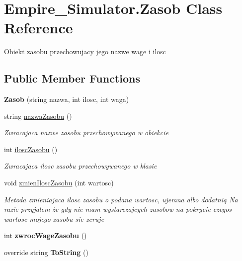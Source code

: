 \hypertarget{class_empire___simulator_1_1_zasob}{\section{Empire\+\_\+\+Simulator.\+Zasob Class Reference}
\label{class_empire___simulator_1_1_zasob}
}


Obiekt zasobu przechowujacy jego nazwe wage i ilosc  


\subsection*{Public Member Functions}
\begin{DoxyCompactItemize}
\item 
\hypertarget{class_empire___simulator_1_1_zasob_a4003837db3e3421e869e6da2ecf13e8f}{{\bfseries Zasob} (string nazwa, int ilosc, int waga)}\label{class_empire___simulator_1_1_zasob_a4003837db3e3421e869e6da2ecf13e8f}

\item 
string \hyperlink{class_empire___simulator_1_1_zasob_a54ab3a43784f56fcb03062678ca7b191}{nazwa\+Zasobu} ()
\begin{DoxyCompactList}\small\item\em Zwracajaca nazwe zasobu przechowywanego w obiekcie \end{DoxyCompactList}\item 
int \hyperlink{class_empire___simulator_1_1_zasob_aeebc81eccdc0d9117de6d1aedd680711}{ilosc\+Zasobu} ()
\begin{DoxyCompactList}\small\item\em Zwracajaca ilosc zasobu przechowywanego w klasie \end{DoxyCompactList}\item 
void \hyperlink{class_empire___simulator_1_1_zasob_a6736e29b299f7dbb7651934b47fb9694}{zmien\+Ilosc\+Zasobu} (int wartosc)
\begin{DoxyCompactList}\small\item\em Metoda zmieniajaca ilosc zasobu o podana wartosc, ujemna albo dodatnią Na razie przyjalem że gdy nie mam wystarczajcych zasobow na pokrycie czegos wartosc mojego zasobu sie zeruje \end{DoxyCompactList}\item 
\hypertarget{class_empire___simulator_1_1_zasob_a980dc48881144d0e8686135a64eb3277}{int {\bfseries zwroc\+Wage\+Zasobu} ()}\label{class_empire___simulator_1_1_zasob_a980dc48881144d0e8686135a64eb3277}

\item 
\hypertarget{class_empire___simulator_1_1_zasob_aaee5a41fce840c8e6780a758e7e07228}{override string {\bfseries To\+String} ()}\label{class_empire___simulator_1_1_zasob_aaee5a41fce840c8e6780a758e7e07228}

\end{DoxyCompactItemize}


